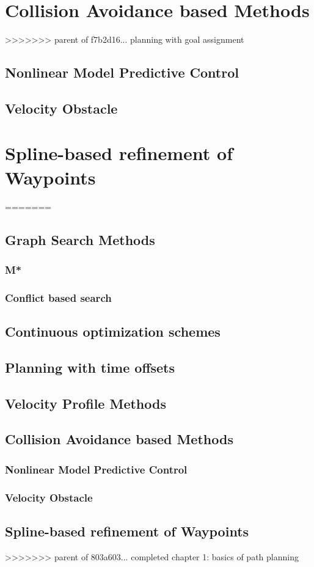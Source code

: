 \section{Collision Avoidance based Methods}
>>>>>>> parent of f7b2d16... planning with goal assignment
\subsection{Nonlinear Model Predictive Control}
\subsection{Velocity Obstacle}

\section{Spline-based refinement of Waypoints}
=======
 \subsection{Graph Search Methods}
 \subsubsection{M*}
 \subsubsection{Conflict based search}
 
 \subsection{Continuous optimization schemes}

 \subsection{Planning with time offsets}

 \subsection{Velocity Profile Methods}

 \subsection{Collision Avoidance based Methods}
 \subsubsection{Nonlinear Model Predictive Control}
 \subsubsection{Velocity Obstacle}

 \subsection{Spline-based refinement of Waypoints}
>>>>>>> parent of 803a603... completed chapter 1: basics of path planning
